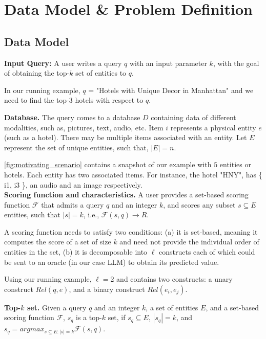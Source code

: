 \section{Data Model \& Problem Definition}\label{sec:dm}

\subsection{Data Model}
\noindent \textbf{Input Query:} A user writes a query $q$ with an input parameter $k$, with the goal of obtaining the top-$k$ set of entities to $q$.

In our running example, $q$ = "Hotels with Unique Decor in Manhattan" and we need to find the top-$3$ hotels with respect to $q$.  

\noindent \textbf{Database.} The query comes to a database $D$ containing data of different modalities, such as, pictures, text, audio, etc. Item $i$ represents a physical entity $e$ (such as a hotel). There may be multiple items associated with an entity. Let $E$ represent the set of unique entities, such that, $|E|=n$.

\autoref{fig:motivating_scenario} contains a snapshot of our example with $5$ entities or hotels. Each entity has two associated items. For instance, the  hotel "HNY", has \{ i1, i3 \}, an audio and an image respectively. \\

\noindent \textbf{Scoring function and characteristics.} A user provides a set-based scoring function $\mathcal{F}$ that admits a query  $q$ and an integer $k$, and scores any subset $s \subseteq E$ entities, such that $|s|=k$, i.e., $\mathcal{F}(s,q) \rightarrow R$. 

A scoring function needs to satisfy two conditions: (a) it is set-based, meaning it computes the score of a set of size $k$ and need not provide the individual order of  entities in the set, (b) it is decomposable into $\ell$ constructs each of which could be sent to an oracle (in our case LLM) to obtain its predicted value. 

Using our running example, $\ell=2$ and contains two constructs: a unary construct $Rel(q,e)$, and a binary construct $Rel(e_i,e_j)$.

\noindent \textbf{Top-$k$ set.} Given a query $q$ and an integer $k$, a set of entities $E$, and a set-based scoring function $\mathcal{F}$, $s_q$ is a top-$k$ set, if $s_q \subseteq E$, $|s_q|=k$, and 
$s_q = argmax_{s \subseteq E: |s|=k} \mathcal{F}(s,q)$.

